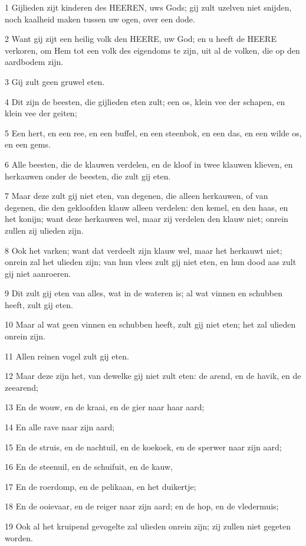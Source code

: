\par 1 Gijlieden zijt kinderen des HEEREN, uws Gods; gij zult uzelven niet snijden, noch kaalheid maken tussen uw ogen, over een dode.
\par 2 Want gij zijt een heilig volk den HEERE, uw God; en u heeft de HEERE verkoren, om Hem tot een volk des eigendoms te zijn, uit al de volken, die op den aardbodem zijn.
\par 3 Gij zult geen gruwel eten.
\par 4 Dit zijn de beesten, die gijlieden eten zult; een os, klein vee der schapen, en klein vee der geiten;
\par 5 Een hert, en een ree, en een buffel, en een steenbok, en een das, en een wilde os, en een gems.
\par 6 Alle beesten, die de klauwen verdelen, en de kloof in twee klauwen klieven, en herkauwen onder de beesten, die zult gij eten.
\par 7 Maar deze zult gij niet eten, van degenen, die alleen herkauwen, of van degenen, die den gekloofden klauw alleen verdelen: den kemel, en den haas, en het konijn; want deze herkauwen wel, maar zij verdelen den klauw niet; onrein zullen zij ulieden zijn.
\par 8 Ook het varken; want dat verdeelt zijn klauw wel, maar het herkauwt niet; onrein zal het ulieden zijn; van hun vlees zult gij niet eten, en hun dood aas zult gij niet aanroeren.
\par 9 Dit zult gij eten van alles, wat in de wateren is; al wat vinnen en schubben heeft, zult gij eten.
\par 10 Maar al wat geen vinnen en schubben heeft, zult gij niet eten; het zal ulieden onrein zijn.
\par 11 Allen reinen vogel zult gij eten.
\par 12 Maar deze zijn het, van dewelke gij niet zult eten: de arend, en de havik, en de zeearend;
\par 13 En de wouw, en de kraai, en de gier naar haar aard;
\par 14 En alle rave naar zijn aard;
\par 15 En de struis, en de nachtuil, en de koekoek, en de sperwer naar zijn aard;
\par 16 En de steenuil, en de schuifuit, en de kauw,
\par 17 En de roerdomp, en de pelikaan, en het duikertje;
\par 18 En de ooievaar, en de reiger naar zijn aard; en de hop, en de vledermuis;
\par 19 Ook al het kruipend gevogelte zal ulieden onrein zijn; zij zullen niet gegeten worden.
